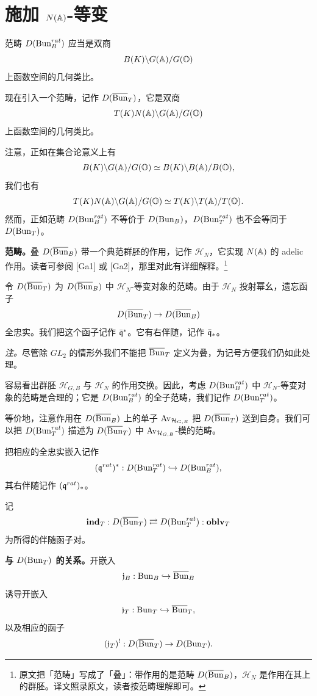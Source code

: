 \section{施加 \texorpdfstring{$N(\mathbb{A})$}{N(A)}-等变}

范畴 $D(\operatorname{Bun}^{rat}_B)$ 应当是双商
\[
  B(K)\backslash G(\mathbb{A})/G(\mathbb O)
\]
上函数空间的几何类比。

现在引入一个范畴，记作 $D(\overline{\operatorname{Bun}}_T)$，它是双商
\[
  T(K)N(\mathbb{A})\backslash G(\mathbb{A})/G(\mathbb O)
\]
上函数空间的几何类比。

注意，正如在集合论意义上有
\[
  B(K)\backslash G(\mathbb{A})/G(\mathbb O)\simeq B(K)\backslash B(\mathbb{A})/B(\mathbb O),
\]
我们也有
\[
  T(K)N(\mathbb{A})\backslash G(\mathbb{A})/G(\mathbb O)\simeq T(K)\backslash T(\mathbb{A})/T(\mathbb O).
\]
然而，正如范畴 $D(\operatorname{Bun}^{rat}_B)$ 不等价于 $D(\operatorname{Bun}_B)$，$D(\operatorname{Bun}^{rat}_T)$ 也不会等同于 $D(\operatorname{Bun}_T)$。

\textbf{范畴。}叠 $D(\overline{\mathrm{Bun}}_B)$ 带一个典范群胚的作用，记作 $\mathcal H_N$，它实现 $N(\mathbb{A})$ 的 adelic 作用。读者可参阅 [Ga1] 或 [Ga2]，那里对此有详细解释。\footnote{原文把「范畴」写成了「叠」：带作用的是范畴 $D(\overline{\mathrm{Bun}}_B)$，$\mathcal H_N$ 是作用在其上的群胚。译文照录原文，读者按范畴理解即可。}

令 $D(\overline{\mathrm{Bun}}_T)$ 为 $D(\overline{\mathrm{Bun}}_B)$ 中 $\mathcal H_N$-等变对象的范畴。由于 $\mathcal H_N$ 投射幂幺，遗忘函子
\[
  D(\overline{\mathrm{Bun}}_T)\to D(\overline{\mathrm{Bun}}_B)
\]
全忠实。我们把这个函子记作 $\bar{\mathfrak{q}}^*$。它有右伴随，记作 $\bar{\mathfrak{q}}_*$。

\emph{注。}尽管除 $GL_2$ 的情形外我们不能把 $\overline{\mathrm{Bun}}_T$ 定义为叠，为记号方便我们仍如此处理。

容易看出群胚 $\mathcal H_{G,B}$ 与 $\mathcal H_N$ 的作用交换。因此，考虑 $D(\operatorname{Bun}^{rat}_B)$ 中 $\mathcal H_N$-等变对象的范畴是合理的；它是 $D(\operatorname{Bun}^{rat}_B)$ 的全子范畴，我们记作 $D(\operatorname{Bun}^{rat}_T)$。

等价地，注意作用在 $D(\overline{\mathrm{Bun}}_B)$ 上的单子 $\mathrm{Av}_{\mathcal H_{G,B}}$ 把 $D(\overline{\mathrm{Bun}}_T)$ 送到自身。我们可以把 $D(\operatorname{Bun}^{rat}_T)$ 描述为 $D(\overline{\mathrm{Bun}}_T)$ 中 $\mathrm{Av}_{\mathcal H_{G,B}}$-模的范畴。

把相应的全忠实嵌入记作
\[
  (\mathfrak{q}^{rat})^* : D(\operatorname{Bun}^{rat}_T)\hookrightarrow D(\operatorname{Bun}^{rat}_B),
\]
其右伴随记作 $(\mathfrak{q}^{rat})_*$。

记
\[
  \mathbf{ind}_T : D(\overline{\mathrm{Bun}}_T)\rightleftarrows D(\operatorname{Bun}^{rat}_T) : \mathbf{oblv}_T
\]
为所得的伴随函子对。

\textbf{与 $D(\operatorname{Bun}_T)$ 的关系。}开嵌入
\[
  \mathfrak{j}_B : \operatorname{Bun}_B\hookrightarrow\overline{\mathrm{Bun}}_B
\]
诱导开嵌入
\[
  \mathfrak{j}_T : \operatorname{Bun}_T\hookrightarrow\overline{\mathrm{Bun}}_T,
\]
以及相应的函子
\[
  (\mathfrak{j}_T)^! : D(\overline{\mathrm{Bun}}_T)\to D(\operatorname{Bun}_T).
\]

